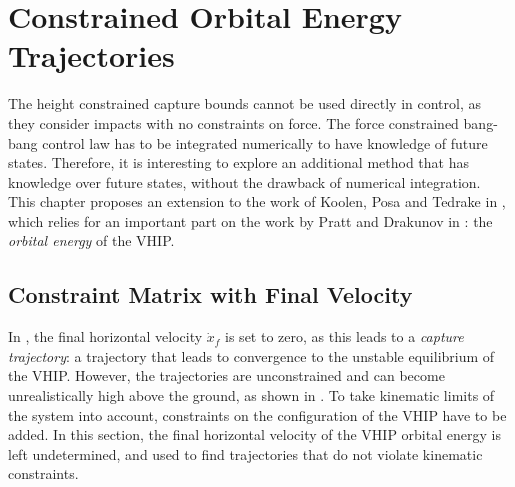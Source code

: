%
\chapter{Constrained Orbital Energy Trajectories}\label{chap:mpc}
The height constrained capture bounds cannot be used directly in control, as they consider impacts with no constraints on force. The force constrained bang-bang control law has to be integrated numerically to have knowledge of future states. Therefore, it is interesting to explore an additional method that has knowledge over future states, without the drawback of numerical integration. This chapter proposes an extension to the work of Koolen, Posa and Tedrake in \cite{koolen2016balance}, which relies for an important part on the work by Pratt and Drakunov in \cite{pratt2007derivation}: the \textit{orbital energy} of the \ac{VHIP}.

\section{Constraint Matrix with Final Velocity}
In \cite{koolen2016balance}, the final horizontal velocity $\dot{x}_f$ is set to zero, as this leads to a \textit{capture trajectory}: a trajectory that leads to convergence to the unstable equilibrium of the \ac{VHIP}. However, the trajectories are unconstrained and can become unrealistically high above the ground, as shown in . To take kinematic limits of the system into account, constraints on the configuration of the \ac{VHIP} have to be added. In this section, the final horizontal velocity of the \ac{VHIP} orbital energy is left undetermined, and used to find trajectories that do not violate kinematic constraints.

